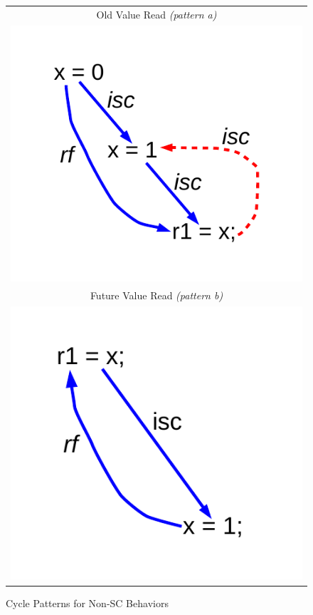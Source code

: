 \begin{figure}[!ht]
\centering
\begin{tabular}{c}
\multicolumn{1}{c}{Old Value Read \textit{(pattern a)}}\\
\includegraphics[scale=.45]{figures/old_val_isc}\\
\multicolumn{1}{c}{Future Value Read \textit{(pattern b)}}\\
\includegraphics[scale=.45]{figures/future_val_isc}\\
\end{tabular}
\caption{\label{fig:fence_implications}Cycle Patterns for Non-SC Behaviors}
\end{figure}

